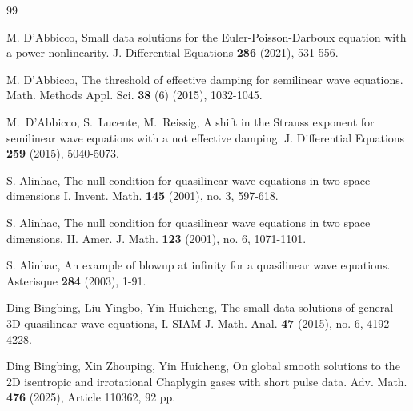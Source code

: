 \documentclass[11pt,twoside]{article}
\theoremstyle{plain}
\theoremstyle{definition}
\theoremstyle{remark}
\numberwithin{equation}{section}
\begin{document}
\begin{thebibliography}{99}


  M. D'Abbicco, Small data solutions for the Euler-Poisson-Darboux equation with a
power nonlinearity. J. Differential Equations \textbf{286} (2021), 531-556.


M. D'Abbicco, The threshold of effective damping for semilinear wave equations.
Math. Methods Appl. Sci. \textbf{38} (6) (2015), 1032-1045.






 M.~D'Abbicco, S.~Lucente, M.~Reissig, A
shift in the Strauss exponent for semilinear wave equations with a
not effective damping. J. Differential Equations \textbf{259} (2015),
5040-5073.


 S. Alinhac, The null condition for quasilinear wave equations in two space dimensions I.
Invent. Math. \textbf{145} (2001), no. 3, 597-618.


 S. Alinhac, The null condition for quasilinear wave equations in two space dimensions, II.
Amer. J. Math. \textbf{123}  (2001), no. 6, 1071-1101.


 S. Alinhac, An example of blowup at infinity for a quasilinear wave equations.
Asterisque \textbf{284}  (2003), 1-91.


 Ding Bingbing, Liu Yingbo, Yin Huicheng,  The small data solutions of general
3D quasilinear wave equations, I.  SIAM J. Math. Anal. \textbf{47} (2015), no. 6, 4192-4228.


 Ding Bingbing, Xin Zhouping, Yin Huicheng,
On global smooth solutions to the 2D isentropic and irrotational Chaplygin gases with short pulse data.
Adv. Math. \textbf{476} (2025), Article 110362, 92 pp.




\end{thebibliography}
\end{document}
